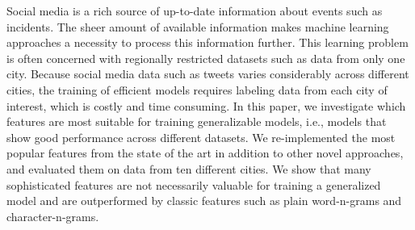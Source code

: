 Social media is a rich source of up-to-date information about events such as incidents. The sheer amount of available information makes machine learning approaches a necessity to process this information further. This learning problem is often concerned with regionally restricted datasets such as data from only one city. Because social media data such as tweets varies considerably across different cities, the training of efficient models requires labeling data from each city of interest, which is costly and time consuming. In this paper, we investigate which features are most suitable for training generalizable models, i.e., models that show good performance across different datasets. We re-implemented the most popular features from the state of the art in addition to other novel approaches, and evaluated them on data from ten different cities. We show that many sophisticated features are not necessarily valuable for training a generalized model and are outperformed by classic features such as plain word-n-grams and character-n-grams.
